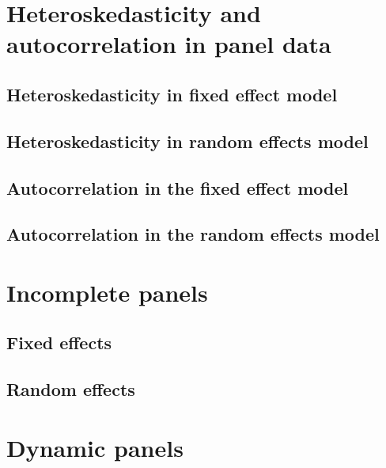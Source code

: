 \section{Heteroskedasticity and autocorrelation in panel data} %
\begin{multicols}{2}
\subsection{Heteroskedasticity in fixed effect model}



\subsection{Heteroskedasticity in random effects model}



\subsection{Autocorrelation in the fixed effect model}



\subsection{Autocorrelation in the random effects model}



\end{multicols}



\section{Incomplete panels} %
\begin{multicols}{2}
\subsection{Fixed effects}


\subsection{Random effects}



\end{multicols}



\section{Dynamic panels} %
\begin{multicols}{2}


\end{multicols}


